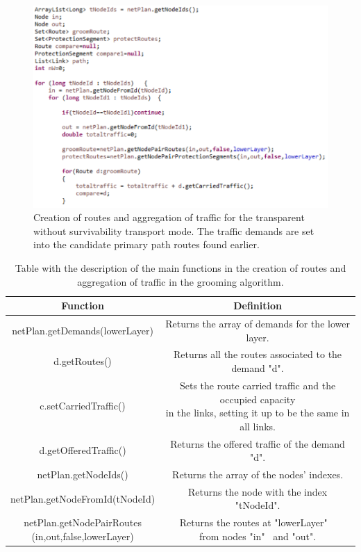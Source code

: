 \begin{figure}[H]
\centering
\includegraphics[width=14cm]{sdf/heuristic/transparent/figures/grooming_transparent_surv2}
\caption{Creation of routes and aggregation of traffic for the transparent without survivability transport mode. The traffic demands are set into the candidate primary path routes found earlier.}
\label{grooming_transparent_surv2}
\end{figure}

\begin{table}[H]
\centering
\begin{tabular}{|| c | c ||}
 \hline
 Function & Definition \\
 \hline\hline
 netPlan.getDemands(lowerLayer) & Returns the array of demands for the lower layer. \\
 \hline
 d.getRoutes() & Returns all the routes associated to the demand "d". \\
 \hline
 c.setCarriedTraffic() & \makecell{Sets the route carried traffic and the occupied capacity\\in the links, setting it up to be the same in all links.} \\
 \hline
 d.getOfferedTraffic() & Returns the offered traffic of the demand "d". \\
 \hline
 netPlan.getNodeIds() & Returns the array of the nodes' indexes. \\
 \hline
 netPlan.getNodeFromId(tNodeId) & Returns the node with the index "tNodeId". \\
 \hline
 \makecell{netPlan.getNodePairRoutes\\(in,out,false,lowerLayer)} &  \makecell{Returns the routes at "lowerLayer" \ \\from nodes "in" \ and "out".} \\
 \hline
\end{tabular}
\caption{Table with the description of the main functions in the creation of routes and aggregation of traffic in the grooming algorithm.}
\label{grooming_table_variables_transparent_surv}
\end{table}


